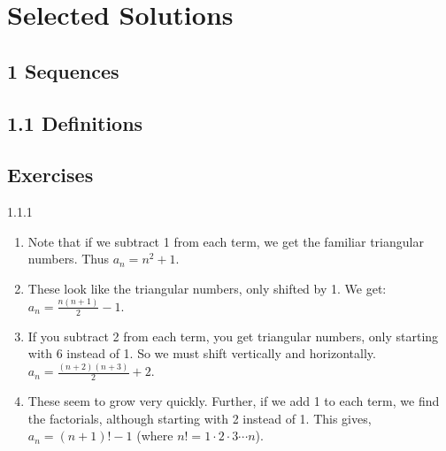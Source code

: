 \documentclass[11pt,]{book}
\theoremstyle{ptxplainnotitle}
\theoremstyle{ptxplaintitle}
\theoremstyle{ptxdefinitionnotitle}
\theoremstyle{ptxdefinitiontitle}
\theoremstyle{ptxdefinitionnotitle}
\theoremstyle{ptxdefinitiontitle}
\theoremstyle{ptxdefinitionnotitle}
\theoremstyle{ptxdefinitiontitle}
\theoremstyle{ptxdefinitiontitlenonumber}
\theoremstyle{ptxdefinitiontitlenonumber}
\numberwithin{equation}{chapter}
\begin{document}
\chapter[{Selected Solutions}]{Selected Solutions}\label{solutions-1}
\section*{1 Sequences}
\section*{1.1 Definitions}
\section*{Exercises}
\begin{divisionexercise}{1.1.1}
\textbf{}\hypertarget{p-90}{}%
\leavevmode%
\begin{enumerate}[label=(\alph*)]
\item\hypertarget{li-62}{}\hypertarget{p-91}{}%
Note that if we subtract 1 from each term, we get the familiar triangular numbers.  Thus \(a_n = n^2 + 1\text{.}\)%
\item\hypertarget{li-63}{}\hypertarget{p-92}{}%
These look like the triangular numbers, only shifted by 1.  We get: \(a_n = \frac{n(n+1)}{2} - 1\text{.}\)%
\item\hypertarget{li-64}{}\hypertarget{p-93}{}%
If you subtract 2 from each term, you get triangular numbers, only starting with 6 instead of 1.  So we must shift vertically and horizontally.  \(a_n = \frac{(n+2)(n+3)}{2} + 2\text{.}\)%
\item\hypertarget{li-65}{}\hypertarget{p-94}{}%
These seem to grow very quickly.  Further, if we add 1 to each term, we find the factorials, although starting with 2 instead of 1.  This gives, \(a_n = (n+1)! - 1\) (where \(n! = 1 \cdot 2 \cdot 3 \cdots n\)).%
\end{enumerate}
%
\end{divisionexercise}%
\end{document}
